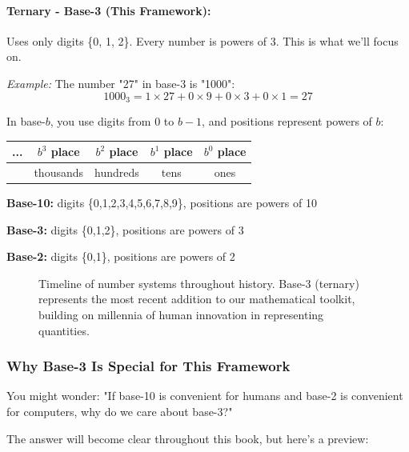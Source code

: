 \paragraph{Ternary - Base-3 (This Framework):} Uses only digits \{0, 1, 2\}. Every number is powers of 3. This is what we'll focus on.

\textit{Example:} The number "27" in base-3 is "1000":
\begin{equation}
1000_3 = 1\times 27 + 0\times 9 + 0\times 3 + 0\times 1 = 27
\end{equation}

\begin{intuitive}
In base-$b$, you use digits from 0 to $b-1$, and positions represent powers of $b$:

\begin{center}
\begin{tabular}{ccccc}
... & $b^3$ place & $b^2$ place & $b^1$ place & $b^0$ place \\
\hline
& thousands & hundreds & tens & ones \\
\end{tabular}
\end{center}

\textbf{Base-10:} digits \{0,1,2,3,4,5,6,7,8,9\}, positions are powers of 10

\textbf{Base-3:} digits \{0,1,2\}, positions are powers of 3

\textbf{Base-2:} digits \{0,1\}, positions are powers of 2
\end{intuitive}

\begin{figure}[h]
\centering

\caption{Timeline of number systems throughout history. Base-3 (ternary) represents the most recent addition to our mathematical toolkit, building on millennia of human innovation in representing quantities.}
\label{fig:timeline}
\end{figure}

\subsubsection*{Why Base-3 Is Special for This Framework}

You might wonder: "If base-10 is convenient for humans and base-2 is convenient for computers, why do we care about base-3?"

The answer will become clear throughout this book, but here's a preview:

